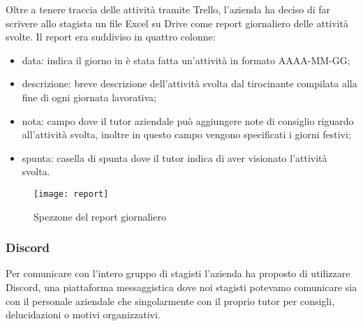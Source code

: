 Oltre a tenere traccia delle attività tramite Trello, l'azienda ha deciso di far scrivere allo stagista un file Excel su Drive come report giornaliero delle attività svolte. Il report era suddiviso in quattro colonne:
\begin{itemize}
	\item data: indica il giorno in è stata fatta un'attività in formato AAAA-MM-GG;
	\item descrizione: breve descrizione dell'attività svolta dal tirocinante compilata alla fine di ogni giornata lavorativa;
	\item nota: campo dove il tutor aziendale può aggiungere note di consiglio riguardo all'attività svolta, inoltre in questo campo vengono specificati i giorni festivi;
	\item spunta: casella di spunta dove il tutor indica di aver visionato l'attività svolta.
\end{itemize}

\begin{figure}[H]
	\begin{center}
		\texttt{[image: report]}
		\caption{Spezzone del report giornaliero}
	\end{center}
\end{figure}


\subsubsection{Discord}

Per comunicare con l'intero gruppo di stagisti l'azienda ha proposto di utilizzare Discord, una piattaforma messaggistica dove noi stagisti potevamo comunicare sia con il personale aziendale che singolarmente con il proprio tutor per consigli, delucidazioni o motivi organizzativi.
